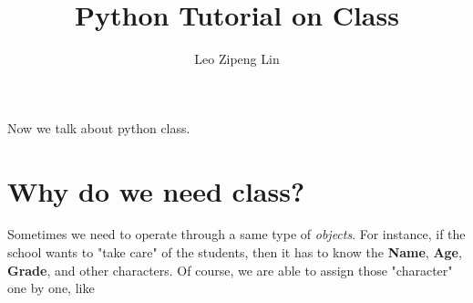 \documentclass[12pt]{article}
\title{Python Tutorial on Class}
\author{Leo Zipeng Lin}
\begin{document}
\maketitle
\newpage
\par Now we talk about python class.
\section{Why do we need class?}
\par Sometimes we need to operate through a same type of \textit{objects}. 
For instance, if the school wants to "take care" of the students, then it has to know the \textbf{Name}, \textbf{Age}, \textbf{Grade}, and other characters.
Of course, we are able to assign those "character" one by one, like 
\end{document}
